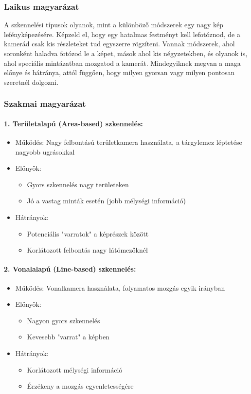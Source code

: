 \documentclass[a4paper,12pt]{article}
\begin{document}
\subsubsection{Laikus magyarázat} A szkennelési típusok olyanok, mint a különböző módszerek egy nagy kép lefényképezésére. Képzeld el, hogy egy hatalmas festményt kell lefotóznod, de a kamerád csak kis részleteket tud egyszerre rögzíteni. Vannak módszerek, ahol soronként haladva fotózod le a képet, mások ahol kis négyzetekben, és olyanok is, ahol speciális mintázatban mozgatod a kamerát. Mindegyiknek megvan a maga előnye és hátránya, attól függően, hogy milyen gyorsan vagy milyen pontosan szeretnél dolgozni.

\subsubsection{Szakmai magyarázat}

\paragraph{1. Területalapú (Area-based) szkennelés:} \begin{itemize} \item Működés: Nagy felbontású területkamera használata, a tárgylemez léptetése nagyobb ugrásokkal \item Előnyök: \begin{itemize} \item Gyors szkennelés nagy területeken \item Jó a vastag minták esetén (jobb mélységi információ) \end{itemize} \item Hátrányok: \begin{itemize} \item Potenciális "varratok" a képrészek között \item Korlátozott felbontás nagy látómezőknél \end{itemize} \end{itemize}

\paragraph{2. Vonalalapú (Line-based) szkennelés:} \begin{itemize} \item Működés: Vonalkamera használata, folyamatos mozgás egyik irányban \item Előnyök: \begin{itemize} \item Nagyon gyors szkennelés \item Kevesebb "varrat" a képben \end{itemize} \item Hátrányok: \begin{itemize} \item Korlátozott mélységi információ \item Érzékeny a mozgás egyenletességére \end{itemize} \end{itemize}
\end{document}
